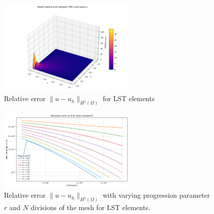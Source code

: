 \begin{figure}[H]
\centering
\includegraphics[width=0.6\textwidth]{GRAFICOS/LST/LST_relative_error_surface_plot.png}
\caption{Relative error \(\|u - u_h\|_{H^1(\Omega)}\) for LST elements}
\label{fig:lst_error_vs_h}
\end{figure}

\begin{figure}[H]
\centering 
\includegraphics[width=0.6\textwidth]{GRAFICOS/LST/errores_por_R.png}
\caption{Relative error \(\|u - u_h\|_{H^1(\Omega)}\) with varying progression parameter $r$ and $N$ divisions of the mesh for LST elements.}
\label{fig:lst_error_vs_h_loglog} 
\end{figure}
